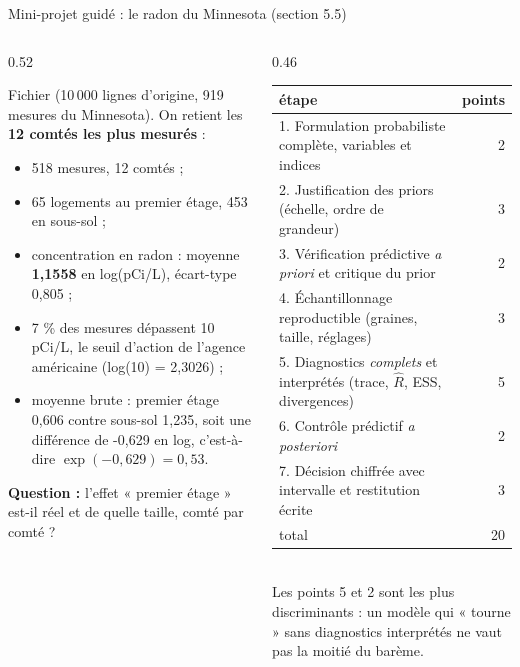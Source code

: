 \begin{frame}{Mini-projet guidé : le radon du Minnesota (section 5.5)}
\small
\begin{columns}[t]
\begin{column}{0.52\textwidth}
\begin{ebox}
Fichier  (10\,000 lignes d'origine, 919 mesures du
Minnesota). On retient les \textbf{12 comtés les plus mesurés} :
\begin{itemize}
  \item 518 mesures, 12 comtés ;
  \item 65 logements au premier étage, 453 en sous-sol ;
  \item concentration en radon : moyenne \textbf{1,1558} en log(pCi/L),
        écart-type 0,805 ;
  \item 7 \% des mesures dépassent 10 pCi/L, le seuil d'action
        de l'agence américaine (log(10) = 2,3026) ;
  \item moyenne brute : premier étage 0,606 contre sous-sol 1,235,
        soit une différence de -0,629 en log, c'est-à-dire
        $\exp(-0{,}629) = 0{,}53$.
\end{itemize}
\textbf{Question :} l'effet « premier étage » est-il réel et de quelle taille,
comté par comté ?
\end{ebox}
\end{column}
\begin{column}{0.46\textwidth}
\begin{abox}
\footnotesize\begin{tabular}{@{}p{4.8cm}r@{}}
\toprule
étape & points \\
\midrule
1. Formulation probabiliste complète, variables et indices & 2 \\
2. Justification des priors (échelle, ordre de grandeur) & 3 \\
3. Vérification prédictive \emph{a priori} et critique du prior & 2 \\
4. Échantillonnage reproductible (graines, taille, réglages) & 3 \\
5. Diagnostics \emph{complets} et interprétés (trace, $\hat R$, ESS, divergences) & 5 \\
6. Contrôle prédictif \emph{a posteriori} & 2 \\
7. Décision chiffrée avec intervalle et restitution écrite & 3 \\
\midrule
total & 20 \\
\bottomrule
\end{tabular}
\vspace{1mm}
\\
\footnotesize Les points 5 et 2 sont les plus discriminants : un modèle qui
« tourne » sans diagnostics interprétés ne vaut pas la moitié du barème.
\end{abox}
\end{column}
\end{columns}
\end{frame}

